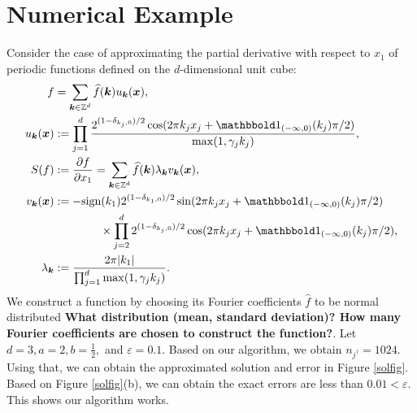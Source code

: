 \documentclass[graybox,footinfo]{svmult}
\newcommand{\DHJRabs}[1]{\ensuremath{{\left \lvert #1 \right \rvert}}}
\begin{document}
\section{Numerical Example} \label{sec:examp}

Consider the case of approximating the  partial derivative with respect to $x_1$ of periodic functions defined on the $d$-dimensional unit cube:
\begin{align*}
f &= \sum_{\bsk \in \bbZ^d} \widehat{f}(\bsk) u_{\bsk} (\bsx), \\
u_{\bsk} (\bsx) &:= \prod_{j=1}^d \frac{2^{(1-\delta_{k_j,0})/2}\cos(2\pi k_j x_j  + \bbone_{(-\infty,0)}(k_j) \pi/2 )}{\max(1,\gamma_j k_j)},  \\
S(f) &: = \frac{\partial f}{\partial x_1} = \sum_{\bsk \in \bbZ^d} \widehat{f}(\bsk) \lambda_{\bsk} v_{\bsk} (\bsx), \\
v_{\bsk}(\bsx) & : =  -\textup{sign}(k_1) 2^{(1-\delta_{k_1,0})/2} \sin(2\pi k_j x_j  + \bbone_{(-\infty,0)}(k_j) \pi/2 ) \\
& \qquad \qquad \times \prod_{j=2}^d 2^{(1-\delta_{k_j,0})/2} \cos(2\pi k_j x_j  + \bbone_{(-\infty,0)}(k_j) \pi/2 ), \\
\lambda_{\bsk} &:= \frac{2 \pi \DHJRabs{k_1}}{\prod_{j=1}^d\max(1,\gamma_j k_j)}.
\end{align*}
We construct a function by choosing its Fourier coefficients $\widehat{f}$ to be normal distributed \textbf{What distribution (mean, standard deviation)?  How many Fourier coefficients are chosen to construct the function?}. Let $d=3, a= 2, b=\frac{1}{2},$ and $\varepsilon = 0.1.$ Based on our algorithm, we obtain $ n_{j^\dagger} = 1024.$ Using that, we can obtain the approximated solution and error in Figure \ref{solfig}. Based on Figure \ref{solfig}(b), we can obtain the exact errors are less than $0.01 < \varepsilon $.  This shows our algorithm works.
\end{document}
